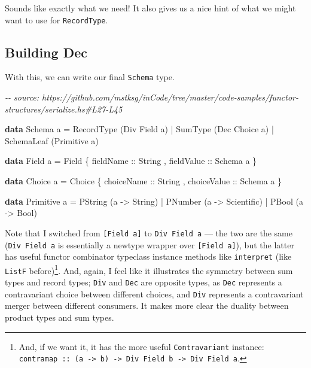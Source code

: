 \documentclass[]{article}
\newenvironment{Shaded}{}{}
\newcommand{\CommentTok}[1]{\textcolor[rgb]{0.38,0.63,0.69}{\textit{#1}}}
\newcommand{\DataTypeTok}[1]{\textcolor[rgb]{0.56,0.13,0.00}{#1}}
\newcommand{\KeywordTok}[1]{\textcolor[rgb]{0.00,0.44,0.13}{\textbf{#1}}}
\newcommand{\NormalTok}[1]{#1}
\newcommand{\OperatorTok}[1]{\textcolor[rgb]{0.40,0.40,0.40}{#1}}
\newcommand{\OtherTok}[1]{\textcolor[rgb]{0.00,0.44,0.13}{#1}}
\begin{document}
Sounds like exactly what we need! It also gives us a nice hint of what we might
want to use for \texttt{RecordType}.

\hypertarget{building-dec}{%
\subsection{Building Dec}\label{building-dec}}

With this, we can write our final \texttt{Schema} type.

\begin{Shaded}
\begin{Highlighting}[]
\CommentTok{{-}{-} source: https://github.com/mstksg/inCode/tree/master/code{-}samples/functor{-}structures/serialize.hs\#L27{-}L45}

\KeywordTok{data} \DataTypeTok{Schema}\NormalTok{ a }\OtherTok{=}
      \DataTypeTok{RecordType}\NormalTok{  (}\DataTypeTok{Div} \DataTypeTok{Field}\NormalTok{ a)}
    \OperatorTok{|} \DataTypeTok{SumType}\NormalTok{     (}\DataTypeTok{Dec} \DataTypeTok{Choice}\NormalTok{ a)}
    \OperatorTok{|} \DataTypeTok{SchemaLeaf}\NormalTok{  (}\DataTypeTok{Primitive}\NormalTok{ a)}

\KeywordTok{data} \DataTypeTok{Field}\NormalTok{ a }\OtherTok{=} \DataTypeTok{Field}
\NormalTok{    \{}\OtherTok{ fieldName  ::} \DataTypeTok{String}
\NormalTok{    ,}\OtherTok{ fieldValue ::} \DataTypeTok{Schema}\NormalTok{ a}
\NormalTok{    \}}

\KeywordTok{data} \DataTypeTok{Choice}\NormalTok{ a }\OtherTok{=} \DataTypeTok{Choice}
\NormalTok{    \{}\OtherTok{ choiceName  ::} \DataTypeTok{String}
\NormalTok{    ,}\OtherTok{ choiceValue ::} \DataTypeTok{Schema}\NormalTok{ a}
\NormalTok{    \}}

\KeywordTok{data} \DataTypeTok{Primitive}\NormalTok{ a }\OtherTok{=}
      \DataTypeTok{PString}\NormalTok{ (a }\OtherTok{{-}>} \DataTypeTok{String}\NormalTok{)}
    \OperatorTok{|} \DataTypeTok{PNumber}\NormalTok{ (a }\OtherTok{{-}>} \DataTypeTok{Scientific}\NormalTok{)}
    \OperatorTok{|} \DataTypeTok{PBool}\NormalTok{   (a }\OtherTok{{-}>} \DataTypeTok{Bool}\NormalTok{)}
\end{Highlighting}
\end{Shaded}

Note that I switched from \texttt{{[}Field\ a{]}} to \texttt{Div\ Field\ a} ---
the two are the same (\texttt{Div\ Field\ a} is essentially a newtype wrapper
over \texttt{{[}Field\ a{]}}), but the latter has useful functor combinator
typeclass instance methods like \texttt{interpret} (like \texttt{ListF}
before)\footnote{And, if we want it, it has the more useful
  \texttt{Contravariant} instance:
  \texttt{contramap\ ::\ (a\ -\textgreater{}\ b)\ -\textgreater{}\ Div\ Field\ b\ -\textgreater{}\ Div\ Field\ a}.}.
And, again, I feel like it illustrates the symmetry between sum types and record
types; \texttt{Div} and \texttt{Dec} are opposite types, as \texttt{Dec}
represents a contravariant choice between different choices, and \texttt{Div}
represents a contravariant merger between different consumers. It makes more
clear the duality between product types and sum types.
\end{document}
